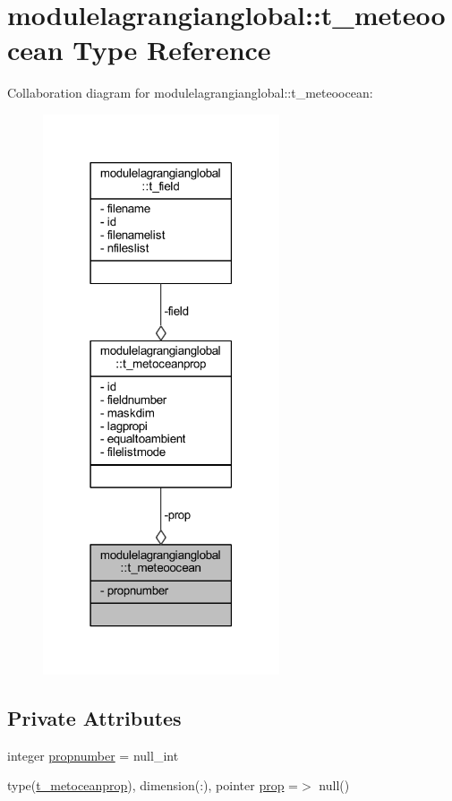 \hypertarget{structmodulelagrangianglobal_1_1t__meteoocean}{}\section{modulelagrangianglobal\+:\+:t\+\_\+meteoocean Type Reference}
\label{structmodulelagrangianglobal_1_1t__meteoocean}


Collaboration diagram for modulelagrangianglobal\+:\+:t\+\_\+meteoocean\+:\nopagebreak
\begin{figure}[H]
\begin{center}
\leavevmode
\includegraphics[width=198pt]{structmodulelagrangianglobal_1_1t__meteoocean__coll__graph}
\end{center}
\end{figure}
\subsection*{Private Attributes}
\begin{DoxyCompactItemize}
\item 
integer \mbox{\hyperlink{structmodulelagrangianglobal_1_1t__meteoocean_a7bd2eb359fd6acd379ed4128a0f1ba01}{propnumber}} = null\+\_\+int
\item 
type(\mbox{\hyperlink{structmodulelagrangianglobal_1_1t__metoceanprop}{t\+\_\+metoceanprop}}), dimension(\+:), pointer \mbox{\hyperlink{structmodulelagrangianglobal_1_1t__meteoocean_aebad27f921a39e06e014e6b51364190b}{prop}} =$>$ null()
\end{DoxyCompactItemize}


